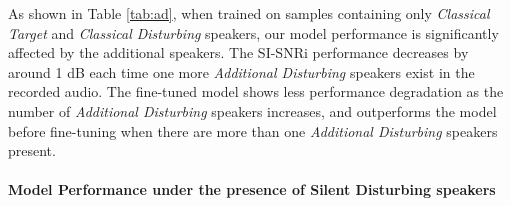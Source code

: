 As shown in Table \ref{tab:ad}, when trained on samples containing only \textit{Classical Target} and \textit{Classical Disturbing} speakers, our model performance is significantly affected by the additional speakers. The SI-SNRi performance decreases by around 1 dB each time one more \textit{Additional Disturbing} speakers exist in the recorded audio. The fine-tuned model shows less performance degradation as the number of \textit{Additional Disturbing} speakers increases, and outperforms the model before fine-tuning when there are more than one \textit{Additional Disturbing} speakers present. 



\paragraph{Model Performance under the presence of Silent Disturbing speakers}

